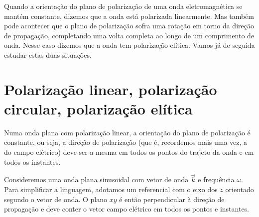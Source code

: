 Quando a orientação do plano de polarização de uma onda eletromagnética se
mantém constante, dizemos que a onda está polarizada linearmente. Mas também
pode acontecer que o plano de polarização sofra uma rotação em torno da direção
de propagação, completando uma volta completa ao longo de um comprimento de
onda. Nesse caso dizemos que a onda tem polarização elítica. Vamos já de seguida
estudar estas duas situações.

\section{Polarização linear, polarização circular, polarização elítica}
Numa onda plana com polarização linear, a orientação do plano de polarização
é constante, ou seja, a direção de polarização (que é, recordemos mais uma vez,
a do campo elétrico) deve ser a mesma em todos os pontos do trajeto da onda e em
todos os instantes.

Consideremos uma onda plana sinusoidal com vetor de onda $\vec k$ e frequência
$\omega$. Para simplificar a linguagem, adotamos um referencial com o eixo dos
$z$ orientado segundo o vetor de onda. O plano $xy$ é então perpendicular à
direção de propagação e deve conter o vetor campo elétrico em todos os pontos e
instantes. 


